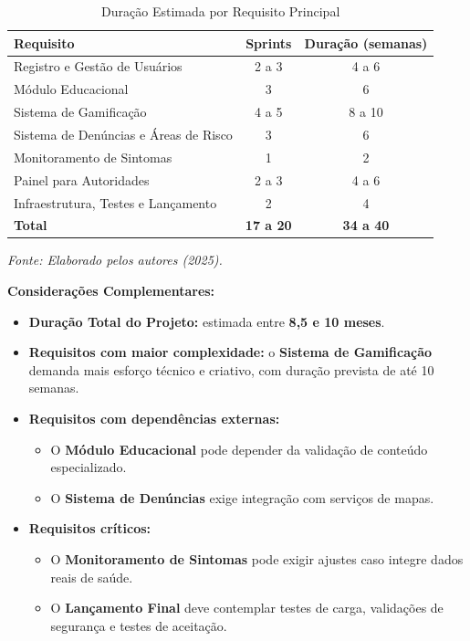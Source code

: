 \documentclass[a5paper, 12pt]{article}
\begin{document}
\begin{table}[H]
\centering
\caption{Duração Estimada por Requisito Principal}
\label{tab:cronograma}
\begin{tabular}{|l|c|c|}
\hline
\textbf{Requisito} & \textbf{Sprints} & \textbf{Duração (semanas)} \\
\hline
Registro e Gestão de Usuários & 2 a 3 & 4 a 6 \\
Módulo Educacional & 3  & 6 \\
Sistema de Gamificação & 4 a 5  & 8 a 10 \\
Sistema de Denúncias e Áreas de Risco & 3  & 6  \\
Monitoramento de Sintomas & 1  & 2  \\
Painel para Autoridades & 2 a 3  & 4 a 6  \\
Infraestrutura, Testes e Lançamento & 2  & 4 \\
\hline
\textbf{Total} & \textbf{17 a 20} & \textbf{34 a 40} \\
\hline
\end{tabular}
\smallskip

\raggedright
\textit{Fonte: Elaborado pelos autores (2025).}
\end{table}

\noindent \textbf{Considerações Complementares:}
\begin{itemize}
    \item \textbf{Duração Total do Projeto:} estimada entre \textbf{8,5 e 10 meses}.
    \item \textbf{Requisitos com maior complexidade:} o \textbf{Sistema de Gamificação} demanda mais esforço técnico e criativo, com duração prevista de até 10 semanas.
    \item \textbf{Requisitos com dependências externas:}
    \begin{itemize}
        \item O \textbf{Módulo Educacional} pode depender da validação de conteúdo especializado.
        \item O \textbf{Sistema de Denúncias} exige integração com serviços de mapas.
    \end{itemize}
    \item \textbf{Requisitos críticos:}
    \begin{itemize}
        \item O \textbf{Monitoramento de Sintomas} pode exigir ajustes caso integre dados reais de saúde.
        \item O \textbf{Lançamento Final} deve contemplar testes de carga, validações de segurança e testes de aceitação.
    \end{itemize}
\end{itemize}
\end{document}
